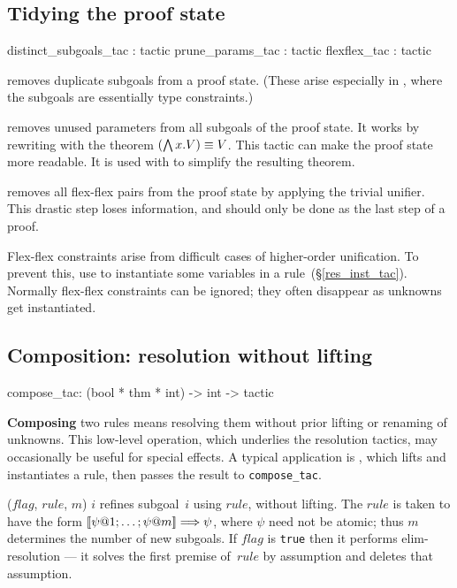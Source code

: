\subsection{Tidying the proof state}
\begin{ttbox} 
distinct_subgoals_tac : tactic
prune_params_tac      : tactic
flexflex_tac          : tactic
\end{ttbox}
\begin{ttdescription}
\item[\ttindexbold{distinct_subgoals_tac}]  
  removes duplicate subgoals from a proof state.  (These arise especially
  in \ZF{}, where the subgoals are essentially type constraints.)

\item[\ttindexbold{prune_params_tac}]  
  removes unused parameters from all subgoals of the proof state.  It works
  by rewriting with the theorem $(\bigwedge x. V)\equiv V$.  This tactic can
  make the proof state more readable.  It is used with
   to simplify the resulting theorem.

\item[\ttindexbold{flexflex_tac}]  
  removes all flex-flex pairs from the proof state by applying the trivial
  unifier.  This drastic step loses information, and should only be done as
  the last step of a proof.

  Flex-flex constraints arise from difficult cases of higher-order
  unification.  To prevent this, use  to instantiate
  some variables in a rule~(\S\ref{res_inst_tac}).  Normally flex-flex
  constraints can be ignored; they often disappear as unknowns get
  instantiated.
\end{ttdescription}


\subsection{Composition: resolution without lifting}
\begin{ttbox}
compose_tac: (bool * thm * int) -> int -> tactic
\end{ttbox}
{\bf Composing} two rules means resolving them without prior lifting or
renaming of unknowns.  This low-level operation, which underlies the
resolution tactics, may occasionally be useful for special effects.
A typical application is , which lifts and instantiates a
rule, then passes the result to {\tt compose_tac}.
\begin{ttdescription}
\item[\ttindexbold{compose_tac} ($flag$, $rule$, $m$) $i$] 
refines subgoal~$i$ using $rule$, without lifting.  The $rule$ is taken to
have the form $\List{\psi@1; \ldots; \psi@m} \Imp \psi$, where $\psi$ need
not be atomic; thus $m$ determines the number of new subgoals.  If
$flag$ is {\tt true} then it performs elim-resolution --- it solves the
first premise of~$rule$ by assumption and deletes that assumption.
\end{ttdescription}


